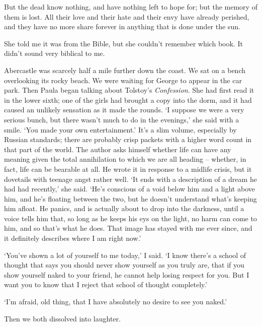 \begin{quoting}
    But the dead know nothing, and have nothing left to hope for; but the memory of them is lost. All their love and their hate and their envy have already perished, and they have no more share forever in anything that is done under the sun.
\end{quoting}

She told me it was from the Bible, but she couldn't remember which book. It didn't sound very biblical to me.

Abercastle was scarcely half a mile further down the coast. We sat on a bench overlooking its rocky beach. We were waiting for George to appear in the car park. Then Paula began talking about Tolstoy's \textit{Confession}. She had first read it in the lower sixth; one of the girls had brought a copy into the dorm, and it had caused an unlikely sensation as it made the rounds. `I suppose we were a very serious bunch, but there wasn't much to do in the evenings,' she said with a smile. `You made your own entertainment.' It's a slim volume, especially by Russian standards; there are probably crisp packets with a higher word count in that part of the world. The author asks himself whether life can have any meaning given the total annihilation to which we are all heading -- whether, in fact, life can be bearable at all. He wrote it in response to a midlife crisis, but it dovetails with teenage angst rather well. `It ends with a description of a dream he had had recently,' she said. `He's conscious of a void below him and a light above him, and he's floating between the two, but he doesn't understand what's keeping him afloat. He panics, and is actually about to drop into the darkness, until a voice tells him that, so long as he keeps his eys on the light, no harm can come to him, and so that's what he does. That image has stayed with me ever since, and it definitely describes where I am right now.'

`You've shown a lot of yourself to me today,' I said. `I know there's a school of thought that says you should never show yourself as you truly are, that if you show yourself naked to your friend, he cannot help losing respect for you. But I want you to know that I reject that school of thought completely.'

`I'm afraid, old thing, that I have absolutely no desire to see you naked.'

Then we both dissolved into laughter.

\section{}

